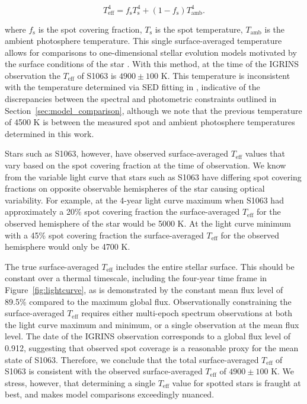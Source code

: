 \documentclass[modern,trackchanges]{aastex631}
\begin{document}
\begin{equation}
T_{\textrm{eff}}^4 = f_{\textrm{s}} T_{\textrm{s}}^4 + (1 -f_{\textrm{s}}) T_{\textrm{amb}}^4 .
\end{equation}

where $f_{\textrm{s}}$ is the spot covering fraction, $T_{\textrm{s}}$ is the spot temperature, $T_{\textrm{amb}}$ is the ambient photosphere temperature. This single surface-averaged temperature allows for comparisons to one-dimensional stellar evolution models motivated by the surface conditions of the star \citep{somers20}. With this method, at the time of the IGRINS observation the $T_{\textrm{eff}}$ of S1063 is $4900\pm100$ K. This temperature is inconsistent with the temperature determined via SED fitting in \citet{leiner17}, indicative of the discrepancies between the spectral and photometric constraints outlined in Section~\ref{sec:model_comparison}, although we note that the previous temperature of 4500 K is between the measured spot and ambient photosphere temperatures determined in this work.

Stars such as S1063, however, have observed surface-averaged $T_{\textrm{eff}}$ values that vary based on the spot covering fraction at the time of observation. We know from the variable light curve that stars such as S1063 have differing spot covering fractions on opposite observable hemispheres of the star causing optical variability. For example, at the 4-year light curve maximum when S1063 had approximately a 20\% spot covering fraction the surface-averaged $T_{\textrm{eff}}$ for the observed hemisphere of the star would be 5000 K. At the light curve minimum with a 45\% spot covering fraction the surface-averaged $T_{\textrm{eff}}$ for the observed hemisphere would only be 4700 K. 

The true surface-averaged $T_{\textrm{eff}}$ includes the entire stellar surface. This should be constant over a thermal timescale, including the four-year time frame in Figure~\ref{fig:lightcurve}, as is demonstrated by the constant mean flux level of 89.5\% compared to the maximum global flux. Observationally constraining the surface-averaged $T_{\textrm{eff}}$ requires either multi-epoch spectrum observations at both the light curve maximum and minimum, or a single observation at the mean flux level. The date of the IGRINS observation corresponds to a global flux level of 0.912, suggesting that observed spot coverage is a reasonable proxy for the mean state of S1063. Therefore, we conclude that the total surface-averaged $T_{\textrm{eff}}$ of S1063 is consistent with the observed surface-averaged $T_{\textrm{eff}}$ of $4900\pm100$ K. We stress, however, that determining a single $T_{\textrm{eff}}$ value for spotted stars is fraught at best, and makes model comparisons exceedingly nuanced.  
\end{document}
